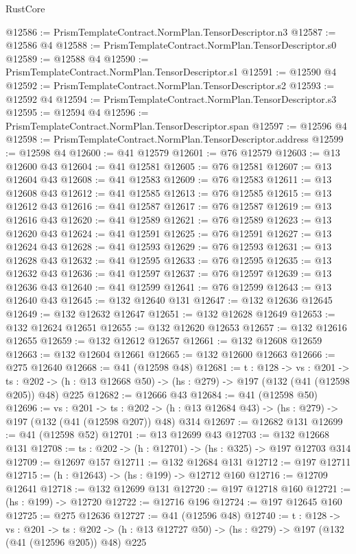 \begin{lexlean}{RustCore}
\begin{coremodule}
@12586 := PrismTemplateContract.NormPlan.TensorDescriptor.n3
@12587 := @12586 @4
@12588 := PrismTemplateContract.NormPlan.TensorDescriptor.s0
@12589 := @12588 @4
@12590 := PrismTemplateContract.NormPlan.TensorDescriptor.s1
@12591 := @12590 @4
@12592 := PrismTemplateContract.NormPlan.TensorDescriptor.s2
@12593 := @12592 @4
@12594 := PrismTemplateContract.NormPlan.TensorDescriptor.s3
@12595 := @12594 @4
@12596 := PrismTemplateContract.NormPlan.TensorDescriptor.span
@12597 := @12596 @4
@12598 := PrismTemplateContract.NormPlan.TensorDescriptor.address
@12599 := @12598 @4
@12600 := @41 @12579
@12601 := @76 @12579
@12603 := @13 @12600 @43
@12604 := @41 @12581
@12605 := @76 @12581
@12607 := @13 @12604 @43
@12608 := @41 @12583
@12609 := @76 @12583
@12611 := @13 @12608 @43
@12612 := @41 @12585
@12613 := @76 @12585
@12615 := @13 @12612 @43
@12616 := @41 @12587
@12617 := @76 @12587
@12619 := @13 @12616 @43
@12620 := @41 @12589
@12621 := @76 @12589
@12623 := @13 @12620 @43
@12624 := @41 @12591
@12625 := @76 @12591
@12627 := @13 @12624 @43
@12628 := @41 @12593
@12629 := @76 @12593
@12631 := @13 @12628 @43
@12632 := @41 @12595
@12633 := @76 @12595
@12635 := @13 @12632 @43
@12636 := @41 @12597
@12637 := @76 @12597
@12639 := @13 @12636 @43
@12640 := @41 @12599
@12641 := @76 @12599
@12643 := @13 @12640 @43
@12645 := @132 @12640 @131
@12647 := @132 @12636 @12645
@12649 := @132 @12632 @12647
@12651 := @132 @12628 @12649
@12653 := @132 @12624 @12651
@12655 := @132 @12620 @12653
@12657 := @132 @12616 @12655
@12659 := @132 @12612 @12657
@12661 := @132 @12608 @12659
@12663 := @132 @12604 @12661
@12665 := @132 @12600 @12663
@12666 := @275 @12640
@12668 := @41 (@12598 @48)
@12681 := {t : @128} ->
  {vs : @201} ->
  {ts : @202} -> (h : @13 @12668 @50) -> (hs : @279) -> @197 (@132 (@41 (@12598 @205)) @48) @225
@12682 := @12666 @43
@12684 := @41 (@12598 @50)
@12696 := {vs : @201} ->
  {ts : @202} -> (h : @13 @12684 @43) -> (hs : @279) -> @197 (@132 (@41 (@12598 @207)) @48) @314
@12697 := @12682 @131
@12699 := @41 (@12598 @52)
@12701 := @13 @12699 @43
@12703 := @132 @12668 @131
@12708 := {ts : @202} -> (h : @12701) -> (hs : @325) -> @197 @12703 @314
@12709 := @12697 @157
@12711 := @132 @12684 @131
@12712 := @197 @12711
@12715 := (h : @12643) -> (hs : @199) -> @12712 @160
@12716 := @12709 @12641
@12718 := @132 @12699 @131
@12720 := @197 @12718 @160
@12721 := (hs : @199) -> @12720
@12722 := @12716 @196
@12724 := @197 @12645 @160
@12725 := @275 @12636
@12727 := @41 (@12596 @48)
@12740 := {t : @128} ->
  {vs : @201} ->
  {ts : @202} -> (h : @13 @12727 @50) -> (hs : @279) -> @197 (@132 (@41 (@12596 @205)) @48) @225

\end{coremodule}
\end{lexlean}
